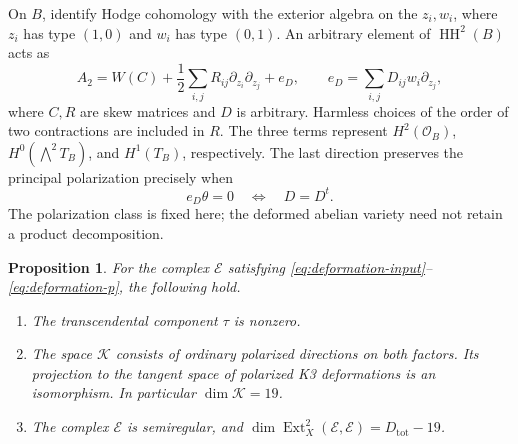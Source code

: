 \documentclass[11pt]{article}
\numberwithin{equation}{section}
\newtheorem{proposition}[theorem]{Proposition}
\theoremstyle{definition}
\theoremstyle{remark}
\begin{document}
On $B$, identify Hodge cohomology with the exterior algebra on the
$z_i,w_i$, where $z_i$ has type $(1,0)$ and $w_i$ has type $(0,1)$.
An arbitrary element of $\operatorname{HH}^2(B)$ acts as
\begin{equation}\label{eq:torus-HH-action}
 A_2=W(C)+\frac12\sum_{i,j}R_{ij}\partial_{z_i}\partial_{z_j}+e_D,
 \qquad e_D=\sum_{i,j}D_{ij}w_i\partial_{z_j},
\end{equation}
where $C,R$ are skew matrices and $D$ is arbitrary. Harmless choices
of the order of two contractions are included in $R$. The three
terms represent $H^2(\mathcal O_B)$, $H^0(\bigwedge^2T_B)$, and
$H^1(T_B)$, respectively. The last direction preserves the principal
polarization precisely when
\[
 e_D\theta=0\quad\Longleftrightarrow\quad D=D^t.
\]
The polarization class is fixed here; the deformed abelian variety
need not retain a product decomposition.

\begin{proposition}\label{prop:deformation-rank}
For the complex $\mathcal E$ satisfying
\eqref{eq:deformation-input}--\eqref{eq:deformation-p}, the following
hold.
\begin{enumerate}
\item The transcendental component $\tau$ is nonzero.
\item The space $\mathcal K$ consists of ordinary polarized directions on
both factors. Its projection to the tangent space of polarized K3
deformations is an isomorphism. In particular $\dim \mathcal K=19$.
\item The complex $\mathcal E$ is semiregular, and
$\dim\operatorname{Ext}^2_X(\mathcal E,\mathcal E)=D_{\mathrm{tot}}-19$.
\end{enumerate}
\end{proposition}
\end{document}
